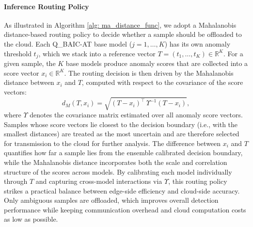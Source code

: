 \documentclass[pdflatex,sn-mathphys-num]{sn-jnl}%
\theoremstyle{thmstyleone}
\theoremstyle{thmstyletwo}%
\theoremstyle{thmstylethree}%
\begin{document}
\paragraph{Inference Routing Policy}
As illustrated in Algorithm \ref{alg: ma_distance_func}, we adopt a Mahalanobis distance-based routing policy to decide whether a sample should be offloaded to the cloud. Each Q\_BAIC-AT base model ($j = 1,\dots,K$) has its own anomaly threshold $t_j$, which we stack into a reference vector $T = (t_1,\dots,t_K) \in \mathbb{R}^K$. For a given sample, the $K$ base models produce anomaly scores that are collected into a score vector $x_i \in \mathbb{R}^K$. The routing decision is then driven by the Mahalanobis distance between $x_i$ and $T$, computed with respect to the covariance of the score vectors:
\begin{equation}
    d_M(T, x_i) = \sqrt{(T - x_i)^{\top}\,\Upsilon^{-1}(T - x_i)},
\end{equation}
where $\Upsilon$ denotes the covariance matrix estimated over all anomaly score vectors. Samples whose score vectors lie closest to the decision boundary (i.e., with the smallest distances) are treated as the most uncertain and are therefore selected for transmission to the cloud for further analysis.
The difference between $x_i$ and $T$ quantifies how far a sample lies from the ensemble calibrated decision boundary, while the Mahalanobis distance incorporates both the scale and correlation structure of the scores across models. By calibrating each model individually through $T$ and capturing cross-model interactions via $\Upsilon$, this routing policy strikes a practical balance between edge-side efficiency and cloud-side accuracy. Only ambiguous samples are offloaded, which improves overall detection performance while keeping communication overhead and cloud computation costs as low as possible.


\begin{algorithm}[!t]
\caption{Mahalanobis Distance-based Routing Policy}\label{alg: ma_distance_func}
\DontPrintSemicolon

\end{algorithm}
\end{document}
